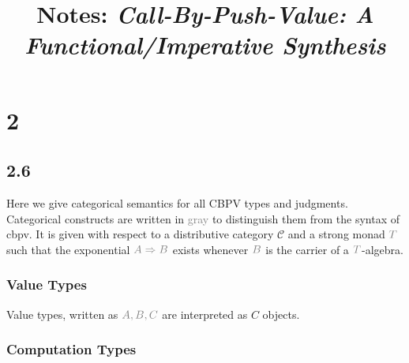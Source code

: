 \documentclass{article}
\title{Notes: \emph{Call-By-Push-Value: A Functional/Imperative Synthesis} }
\newcommand{\sem}[1]{\llbracket #1 \rrbracket}
\newcommand{\gr}[1]{\textcolor{gray}{#1}}
\begin{document}
\maketitle
 
\section*{2}

\subsection*{2.6}

Here we give categorical semantics for all CBPV types and judgments. Categorical constructs are written in \gr{gray} to distinguish them from the syntax of cbpv. It is given with respect to a distributive category $\mathcal C$ and a strong monad $\gr{T}$ such that the exponential $\gr{A \Rightarrow B}$ exists whenever $\gr{B}$ is the carrier of a $\gr{T}$-algebra.

\subsubsection*{Value Types}

Value types, written as $\gr{A,B,C}$ are interpreted as $C$ objects.


\subsubsection*{Computation Types}

\end{document}
